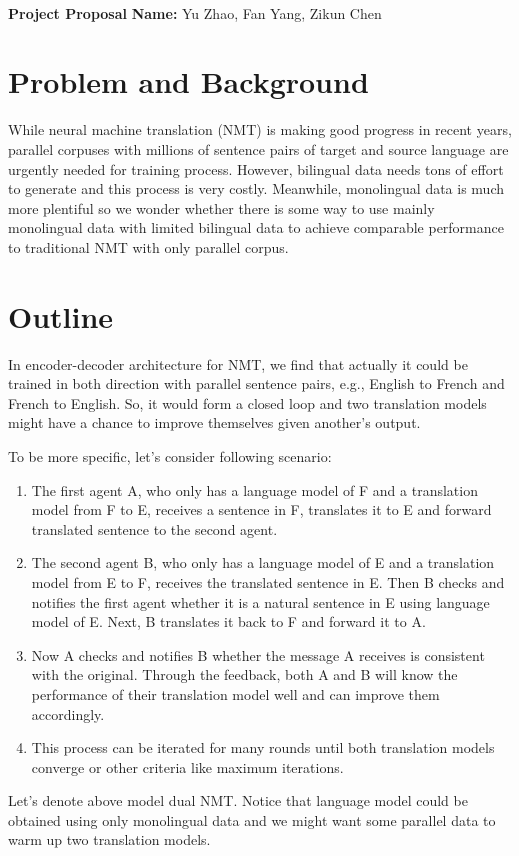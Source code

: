 \documentclass[11pt]{article}
\begin{document}
\\
{{\bf Project Proposal}} \hfill {{\bf Name:} Yu Zhao, Fan Yang, Zikun Chen} \\
\part{Problem and Background}
While neural machine translation (NMT) is making good progress in recent years, parallel corpuses with millions of sentence pairs of target and source language are urgently needed for training process. However, bilingual data needs tons of effort to generate and this process is very costly. Meanwhile, monolingual data is much more plentiful so we wonder whether there is some way to use mainly monolingual data with limited bilingual data to achieve comparable performance to traditional NMT with only parallel corpus.

{\color{red}{I think here maybe we should talk about the dual learning paper we see.}}
\part{Outline}
In encoder-decoder architecture for NMT, we find that actually it could be trained in both direction with parallel sentence pairs, e.g., English to French and French to English. So, it would form a closed loop and two translation models might have a chance to improve themselves given another's output.

To be more specific, let's consider following scenario:
\begin{enumerate}[label*=\arabic*.]
\item The first agent A, who only has a language model of F and a translation model from F to E, receives a sentence in F, translates it to E and forward translated sentence to the second agent.

\item The second agent B, who only has a language model of E and a translation model from E to F, receives the translated sentence in E. Then B checks and notifies the first agent whether it is a natural sentence in E using language model of E. Next, B translates it back to F and forward it to A.

\item Now A checks and notifies B whether the message A receives is consistent with the original. Through the feedback, both A and B will know the performance of their translation model well and can improve them accordingly.

\item This process can be iterated for many rounds until both translation models converge or other criteria like maximum iterations.
\end{enumerate}
Let's denote above model dual NMT. Notice that language model could be obtained using only monolingual data and we might want some parallel data to warm up two translation models.
\end{document}
